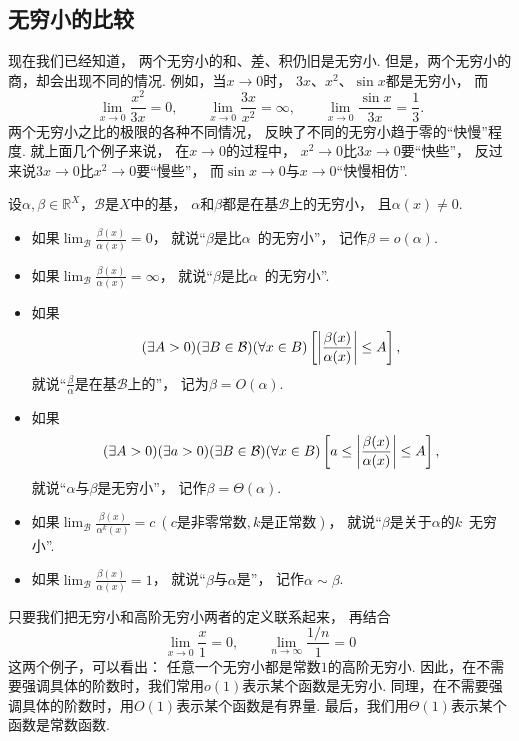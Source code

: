 \subsection{无穷小的比较}
现在我们已经知道，
两个无穷小的和、差、积仍旧是无穷小.
但是，两个无穷小的商，却会出现不同的情况.
例如，当\(x\to0\)时，
\(3x\)、\(x^2\)、\(\sin x\)都是无穷小，
而\[
	\lim_{x\to0}\frac{x^2}{3x}=0, \qquad
	\lim_{x\to0}\frac{3x}{x^2}=\infty, \qquad
	\lim_{x\to0}\frac{\sin x}{3x}=\frac{1}{3}.
\]
两个无穷小之比的极限的各种不同情况，
反映了不同的无穷小趋于零的“快慢”程度.
就上面几个例子来说，
在\(x\to0\)的过程中，
\(x^2\to0\)比\(3x\to0\)要“快些”，
反过来说\(3x\to0\)比\(x^2\to0\)要“慢些”，
而\(\sin x\to0\)与\(x\to0\)“快慢相仿”.

\begin{definition}\label{definition:无穷小和无穷大.无穷小的比较}
设\(\alpha,\beta\in\mathbb{R}^X\)，\(\mathcal{B}\)是\(X\)中的基，
\(\alpha\)和\(\beta\)都是在基\(\mathcal{B}\)上的无穷小，
且\(\alpha(x)\neq0\).
\newcommand{\lf}[1][]{\lim_\mathcal{B} \frac{\beta(x)}{\alpha^{#1}(x)}}
\begin{itemize}
	\item 如果\(\lf=0\)，
	就说“\(\beta\)是比\(\alpha\)~的无穷小”，
	记作\(\beta=o(\alpha)\).

	\item 如果\(\lf=\infty\)，
	就说“\(\beta\)是比\(\alpha\)~的无穷小”.

	\item 如果\[
		(\exists A>0)
		(\exists B\in\mathcal{B})
		(\forall x\in B)
		\left[
			\abs{\frac{\beta(x)}{\alpha(x)}} \leq A
		\right],
	\]
	就说“\(\frac\beta\alpha\)是在基\(\mathcal{B}\)上的”，
	记为\(\beta = O(\alpha)\).

	\item 如果\[
		(\exists A>0)
		(\exists a>0)
		(\exists B\in\mathcal{B})
		(\forall x\in B)
		\left[
			a \leq \abs{\frac{\beta(x)}{\alpha(x)}} \leq A
		\right],
	\]
	就说“\(\alpha\)与\(\beta\)是无穷小”，
	记作\(\beta = \Theta(\alpha)\).

	\item 如果\(\lf[k]=c\ (\text{$c$是非零常数},\text{$k$是正常数})\)，
	就说“\(\beta\)是关于\(\alpha\)的\(k\)~无穷小”.

	\item 如果\(\lf=1\)，
	就说“\(\beta\)与\(\alpha\)是”，
	记作\(\alpha\sim\beta\).
\end{itemize}
\end{definition}
\begin{remark}
只要我们把无穷小和高阶无穷小两者的定义联系起来，
再结合\[
	\lim_{x\to0} \frac{x}{1} = 0,
	\qquad
	\lim_{n\to\infty} \frac{1/n}{1} = 0
\]这两个例子，可以看出：
任意一个无穷小都是常数\(1\)的高阶无穷小.
因此，在不需要强调具体的阶数时，我们常用\(o(1)\)表示某个函数是无穷小.
同理，在不需要强调具体的阶数时，用\(O(1)\)表示某个函数是有界量.
最后，我们用\(\Theta(1)\)表示某个函数是常数函数.
\end{remark}

